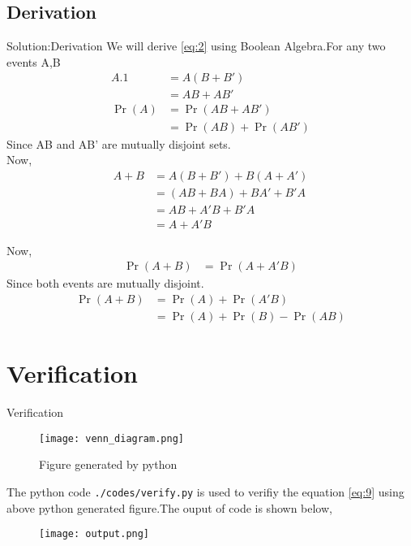 \documentclass{beamer}
\providecommand{\pr}[1]{\ensuremath{\Pr\left(#1\right)}}
\providecommand{\brak}[1]{\ensuremath{\left(#1\right)}}
\begin{document}
   \subsection{Derivation}
        \begin{frame}{Solution:Derivation}
           We will derive \eqref{eq:2} using Boolean Algebra.For any two events A,B  
              \begin{align}
                    A.1 &= A\brak{B + B'}\\
                          &= AB + AB'\\
                    \pr{A} &= \pr{AB + AB'}\\
                               &= \pr{AB} + \pr{AB'} 
                  \end{align} 
          Since AB and AB' are mutually disjoint sets.\\ Now,
                   \begin{align}
                     A + B &= A\brak{B+B'} + B\brak{A+A'}\\
                              &= \brak{AB + BA} + BA' + B'A\\
                              &= AB + A'B + B'A\\
                              & = A + A'B
                    \end{align}
             \end{frame}
             \begin{frame}
            Now,
                 \begin{align}
                   \pr{A+B} &= \pr{A + A'B}
                 \end{align}
               Since both events are mutually disjoint.
                  \begin{align}
                   \pr{A+B}  & = \pr{A} + \pr{A'B}\\
                                  & = \pr{A} + \pr{B} - \pr{AB}
                  \end{align}
             \end{frame}
     \section{Verification}
       \begin{frame}{Verification}
          \begin{figure}[h!]
               \centering
               \texttt{[image: venn\_diagram.png]}
               \caption{ Figure generated by python}
               \label{Figure 1}
             \end{figure}
           \end{frame}
         \begin{frame}
            The python code \texttt{./codes/verify.py} is used to verifiy the equation \eqref{eq:9} using above python generated figure.The ouput of code is shown below,
            \begin{figure}[h!]
              \centering
              \texttt{[image: output.png]}
              \caption{}
             \end{figure}
              \end{frame}
      
\end{document}
